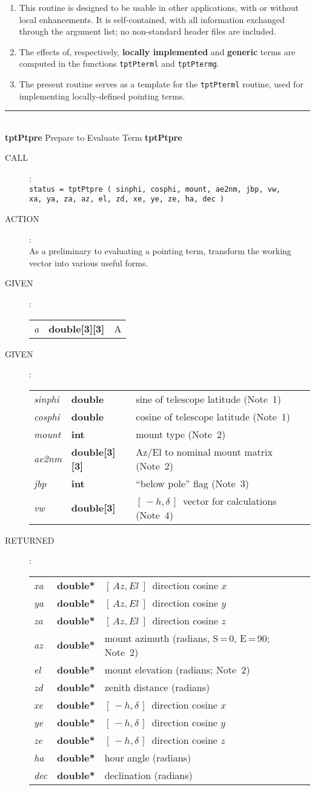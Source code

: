 \documentclass[12pt,fleqn,twoside]{article}
\renewcommand{\_}{{\tt\char'137}}     %
\newcommand{\mhadec}     {$[\,-h,\delta\,]$}
\newcommand{\azel}      {$[\,Az,El~]$}
\newcommand{\routine}[2]
{
  \newpage
  \rule{\textwidth}{0.3mm}\\ \nopagebreak
  {\Large {\bf #1} \hfill #2 \hfill {\bf #1}}
  \vspace{-1ex}
}
\newcommand{\call}[1]
{
  \goodbreak
  \begin{description}
    \item[CALL]: \\[0.5ex] \nopagebreak
        {\tt #1}
  \end{description}
  \vspace{-3ex}
}
\newcommand{\action}[1]
{
  \goodbreak
  \begin{description}
    \item[ACTION]: \\[0.5ex] \nopagebreak
        #1
  \end{description}
  \vspace{-3ex}
}
\newcommand{\args}[2]
{
  \goodbreak
  \begin{description}
  \item[#1]: \\[1.5ex] \nopagebreak
    \hspace*{-0.9em}
    \begin{tabular}{p{4.5em}p{5.8em}p{23.5em}}
      #2
    \end{tabular}
  \end{description}
  \vspace{-3ex}
}
\newcommand{\spec}[3]
{
  {\em {#1}} & {\bf \mbox{#2}} & {#3}
}
\begin{document}
{\begin{enumerate}
      to fit telescope, or telescope adjusted to fit star) is
      being used.
\item This routine is designed to be usable in other applications,
      with or without local enhancements.  It is self-contained, with
      all information exchanged through the argument list;  no
      non-standard header files are included.
\item The effects of, respectively, {\bf locally implemented}
      and {\bf generic}
      terms are computed in the functions {\tt tptPterml} and
      {\tt tptPtermg}.
\item The present routine serves as a template for the {\tt tptPterml}
      routine, used for implementing locally-defined pointing terms.
\end{enumerate}
}
\routine{tptPtpre}{Prepare to Evaluate Term}
\label{tptPtpre}
\call{status = tptPtpre ( sinphi, cosphi, mount, ae2nm, jbp, vw, \\
                  \hspace*{9.5em} xa, ya, za, az, el, zd,
                                  xe, ye, ze, ha, dec )}
\action{As a preliminary to evaluating a pointing term, transform the
        working vector into various useful forms.}
\args{GIVEN}
{
\spec{a}{double[3][3]}{A}
}
\args{GIVEN}
{
\spec{sinphi}{double}{sine of telescope latitude (Note~1)} \\
\spec{cosphi}{double}{cosine of telescope latitude (Note~1)} \\
\spec{mount}{int}{mount type (Note~2)} \\
\spec{ae2nm}{double[3][3]}{Az/El to nominal mount matrix (Note~2)} \\
\spec{jbp}{int}{``below pole'' flag (Note~3)} \\
\spec{vw}{double[3]}{\mhadec\ vector for calculations (Note~4)}
}
\args{RETURNED}
{
\spec{xa}{double*}{\azel\ direction cosine $x$} \\
\spec{ya}{double*}{\azel\ direction cosine $y$} \\
\spec{za}{double*}{\azel\ direction cosine $z$} \\
\spec{az}{double*}{mount azimuth (radians, S\,=\,0, E\,=\,90; Note~2)} \\
\spec{el}{double*}{mount elevation (radians; Note~2)} \\
\spec{zd}{double*}{zenith distance (radians)} \\
\spec{xe}{double*}{\mhadec\ direction cosine $x$} \\
\spec{ye}{double*}{\mhadec\ direction cosine $y$} \\
\spec{ze}{double*}{\mhadec\ direction cosine $z$} \\
\spec{ha}{double*}{hour angle (radians)} \\
\spec{dec}{double*}{declination (radians)}
}
\end{document}
